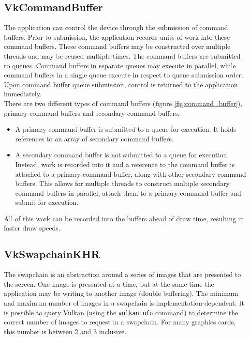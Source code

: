 \documentclass[12pt]{report}
\theoremstyle{definition}
\begin{document}
      \subsection{VkCommandBuffer}

        The application can control the device through the submission of command
        buffers. Prior to submission, the application records units of work
        into these command buffers. These command buffers may be constructed
        over multiple threads and may be reused multiple times. The command
        buffers are submitted to queues. Command buffers in separate queues
        may execute in parallel, while command buffers in a single queue
        execute in respect to queue submission order. Upon command buffer
        queue submission, control is returned to the application immediately. \\

        There are two different types of command buffers (figure \ref{fig:command_buffer}),
        primary command buffers and secondary command buffers.

        \begin{itemize}
          \item A primary command buffer is submitted to a queue for execution.
          It holds references to an array of secondary command buffers.
          \item A secondary command buffer is not submitted to a queue for
          execution. Instead, work is recorded into it and a reference to the
          command buffer is attached to a primary command buffer, along with
          other secondary command buffers. This allows for multiple threads to
          construct multiple secondary command buffers in parallel, attach
          them to a primary command buffer and submit for execution.
        \end{itemize}

        All of this work can be recorded into the buffers ahead of draw time,
        resulting in faster draw speeds.

      \subsection{VkSwapchainKHR}

        The swapchain is an abstraction around a series of images that are presented
        to the screen. One image is presented at a time, but at the same time 
        the application may be writing to another image (double buffering). The
        minimum and maximum number of images in a swapchain is implementation-dependent.
        It is possible to query Vulkan (using the \texttt{vulkaninfo} command)
        to determine the correct number of images to request in a swapchain. For
        many graphics cards, this number is between 2 and 3 inclusive. \\
\end{document}
